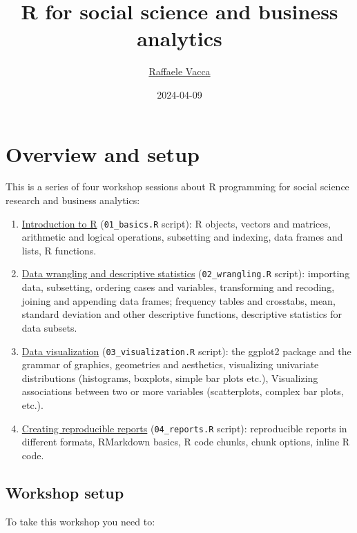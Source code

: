 \documentclass[
]{book}
\title{R for social science and business analytics}
\author{\href{http://www.raffaelevacca.com/}{Raffaele Vacca}}
\date{2024-04-09}
\providecommand{\tightlist}{%
  \setlength{\itemsep}{0pt}\setlength{\parskip}{0pt}}
\begin{document}
\maketitle

{
\setcounter{tocdepth}{1}
\tableofcontents
}
\hypertarget{overview-and-setup}{%
\chapter{Overview and setup}\label{overview-and-setup}}

This is a series of four workshop sessions about R programming for social science research and business analytics:

\begin{enumerate}
\def\labelenumi{\arabic{enumi}.}
\tightlist
\item
  \protect\hyperlink{intro}{Introduction to R} (\texttt{01\_basics.R} script): R objects, vectors and matrices, arithmetic and logical operations, subsetting and indexing, data frames and lists, R functions.
\item
  \protect\hyperlink{wrangling}{Data wrangling and descriptive statistics} (\texttt{02\_wrangling.R} script): importing data, subsetting, ordering cases and variables, transforming and recoding, joining and appending data frames; frequency tables and crosstabs, mean, standard deviation and other descriptive functions, descriptive statistics for data subsets.
\item
  \protect\hyperlink{visualization}{Data visualization} (\texttt{03\_visualization.R} script): the ggplot2 package and the grammar of graphics, geometries and aesthetics, visualizing univariate distributions (histograms, boxplots, simple bar plots etc.), Visualizing associations between two or more variables (scatterplots, complex bar plots, etc.).
\item
  \protect\hyperlink{reproducible}{Creating reproducible reports} (\texttt{04\_reports.R} script): reproducible reports in different formats, RMarkdown basics, R code chunks, chunk options, inline R code.
\end{enumerate}

\hypertarget{setup}{%
\section{Workshop setup}\label{setup}}

To take this workshop you need to:
\end{document}
